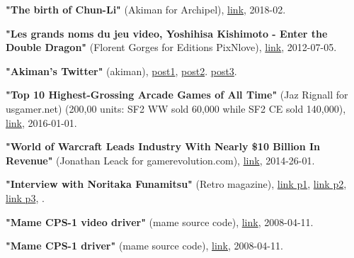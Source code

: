 \renewcommand{\bibname}{References}
\begin{thebibliography}{999}


  \textbf{ "The birth of Chun-Li"} (Akiman for Archipel),
  \href{https://www.youtube.com/watch?v=RxIXilYv0kM}{link},
  2018-02.


  \textbf{ "Les grands noms du jeu video, Yoshihisa Kishimoto - Enter the Double Dragon"} (Florent Gorges for Editions PixNlove),
  \href{https://www.editionspixnlove.com/les-grands-noms-du-jeu-video/289-yoshihisa-kishimoto-enter-the-double-dragon.html}{link},
  2012-07-05.


  \textbf{ "Akiman's Twitter"} (akiman),
  \href{https://twitter.com/akiman7/status/465507673572519936}{post1},
  \href{https://twitter.com/akiman7/status/309615270815731712}{post2}.
  \href{https://twitter.com/akiman7/status/386598518380453888}{post3}.

  \textbf{ "Top 10 Highest-Grossing Arcade Games of All Time"} (Jaz Rignall for usgamer.net) (200,00 units: SF2 WW sold 60,000 while SF2 CE sold 140,000),
  \href{https://www.usgamer.net/articles/top-10-biggest-grossing-arcade-games-of-all-time}{link},
  2016-01-01.

  \textbf{ "World of Warcraft Leads Industry With Nearly \$10 Billion In Revenue"} (Jonathan Leack for gamerevolution.com),
  \href{https://www.gamerevolution.com/features/13510-world-of-warcraft-leads-industry-with-nearly-10-billion-in-revenue#/slide/1}{link},
  2014-26-01.
  
  \textbf{"Interview with Noritaka Funamitsu"} (Retro magazine),
  \href{http://fightingstreet.com/folders/variousinfofolder/interviewfolder/sfii_funamitsu/funamitsu1.jpg}{link p1},
  \href{http://fightingstreet.com/folders/variousinfofolder/interviewfolder/sfii_funamitsu/funamitsu2.jpg}{link p2},
  \href{http://fightingstreet.com/folders/variousinfofolder/interviewfolder/sfii_funamitsu/funamitsu3.jpg}{link p3},
  .

  \textbf{"Mame CPS-1 video driver"} (mame source code),
  \href{https://github.com/mamedev/mame/blob/e070405df99e6a5997d5a64ecd62e7161c729a9d/src/mame/video/cps1.cpp#L269}{link},
  2008-04-11.

  \textbf{"Mame CPS-1 driver"} (mame source code),
  \href{https://github.com/mamedev/mame/blob/e070405df99e6a5997d5a64ecd62e7161c729a9d/src/mame/drivers/cps1.cpp#L567}{link},
  2008-04-11.


\end{thebibliography}
